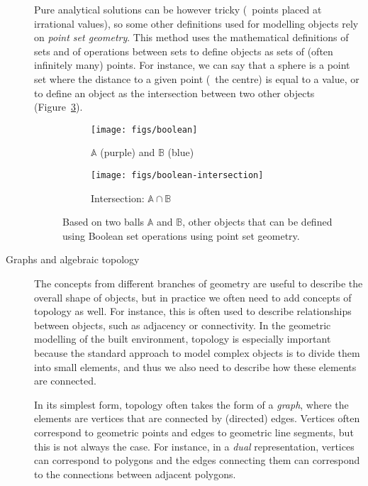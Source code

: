 \begin{description}
Pure analytical solutions can be however tricky (\eg\ points placed at irrational values), so some other definitions used for modelling objects rely on \emph{point set geometry}.
This method uses the mathematical definitions of sets and of operations between sets to define objects as sets of (often infinitely many) points.
For instance, we can say that a sphere is a point set where the distance to a given point (\ie\ the centre) is equal to a value, or to define an object as the intersection between two other objects (Figure~\ref{fig:boolean}).

\begin{figure}[htbp]
\centering
\begin{subfigure}[b]{0.45\linewidth}
\texttt{[image: figs/boolean]}
\caption{$\mathbb{A}$ (purple) and $\mathbb{B}$ (blue)}%
\label{subfig:boolean}
\end{subfigure}
\begin{subfigure}[b]{0.45\linewidth}
\texttt{[image: figs/boolean-intersection]}
\caption{Intersection: $\mathbb{A} \cap \mathbb{B}$}%
\label{subfig:boolean-intersection}
\end{subfigure}
\caption{Based on two balls $\mathbb{A}$ and $\mathbb{B}$, other objects that can be defined using Boolean set operations using point set geometry.}%
\label{fig:boolean}
\end{figure}

\item[Graphs and algebraic topology]
The concepts from different branches of geometry are useful to describe the overall shape of objects, but in practice we often need to add concepts of topology as well.
For instance, this is often used to describe relationships between objects, such as adjacency or connectivity.
In the geometric modelling of the built environment, topology is especially important because the standard approach to model complex objects is to divide them into small elements, and thus we also need to describe how these elements are connected.

In its simplest form, topology often takes the form of a \emph{graph}, where the elements are vertices that are connected by (directed) edges.
Vertices often correspond to geometric points and edges to geometric line segments, but this is not always the case.
For instance, in a \emph{dual} representation, vertices can correspond to polygons and the edges connecting them can correspond to the connections between adjacent polygons.


\end{description}
